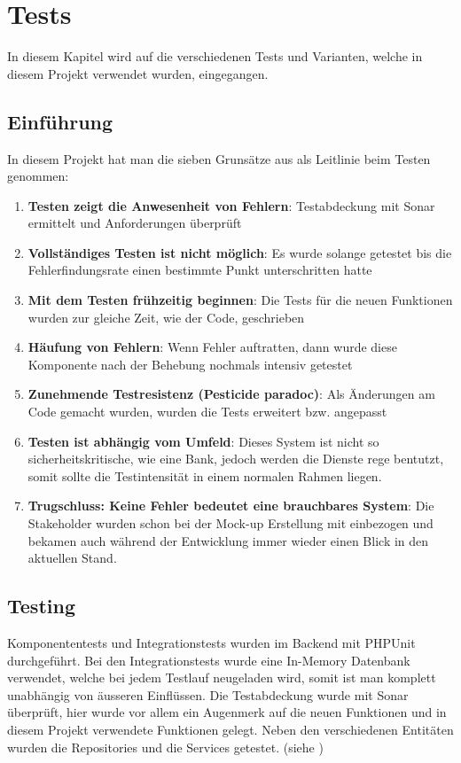 %
%

\chapter{Tests}\label{chap.tests} 
In diesem Kapitel wird auf die verschiedenen Tests und Varianten, welche in diesem Projekt verwendet wurden, eingegangen.

\section{Einführung}
In diesem Projekt hat man die sieben Grunsätze aus \cite{test_soft_book} als Leitlinie beim Testen genommen:
\begin{enumerate}
\item \textbf{Testen zeigt die Anwesenheit von Fehlern}: Testabdeckung mit Sonar ermittelt und Anforderungen überprüft
\item \textbf{Vollständiges Testen ist nicht möglich}: Es wurde solange getestet bis die Fehlerfindungsrate einen bestimmte Punkt unterschritten hatte
\item \textbf{Mit dem Testen frühzeitig beginnen}: Die Tests für die neuen Funktionen wurden zur gleiche Zeit, wie der Code, geschrieben
\item \textbf{Häufung von Fehlern}: Wenn Fehler auftratten, dann wurde diese Komponente nach der Behebung nochmals intensiv getestet
\item \textbf{Zunehmende Testresistenz (Pesticide paradoc)}: Als Änderungen am Code gemacht wurden, wurden die Tests erweitert bzw. angepasst
\item \textbf{Testen ist abhängig vom Umfeld}: Dieses System ist nicht so sicherheitskritische, wie eine Bank, jedoch werden die Dienste rege bentutzt, somit sollte die Testintensität in einem normalen Rahmen liegen.
\item \textbf{Trugschluss: Keine Fehler bedeutet eine brauchbares System}: Die Stakeholder wurden schon bei der Mock-up Erstellung mit einbezogen und bekamen auch während der Entwicklung immer wieder einen Blick in den aktuellen Stand.
\end{enumerate}

\section{Testing}
Komponententests und Integrationstests wurden im Backend mit PHPUnit durchgeführt. Bei den Integrationstests wurde eine In-Memory Datenbank verwendet, welche bei jedem Testlauf neugeladen wird, somit ist man komplett unabhängig von äusseren Einflüssen. Die Testabdeckung wurde mit Sonar überprüft, hier wurde vor allem ein Augenmerk auf die neuen Funktionen und in diesem Projekt verwendete Funktionen gelegt. Neben den verschiedenen Entitäten wurden die Repositories und die Services getestet. (siehe \cite{test_soft_book})

